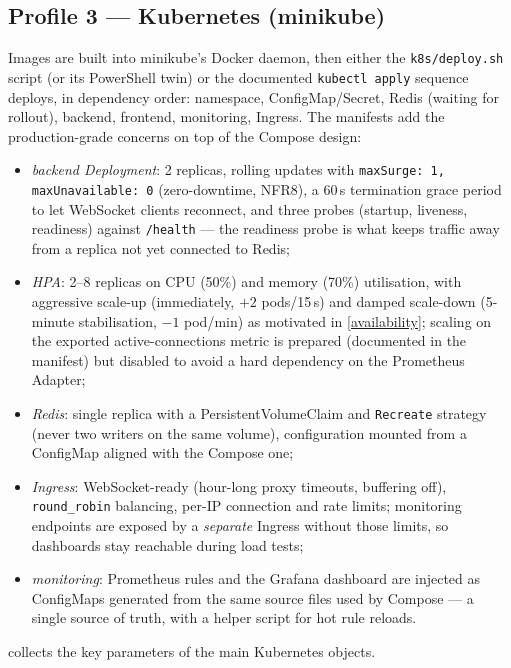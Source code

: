 \documentclass{scrartcl}
\begin{document}
\subsection{Profile 3 --- Kubernetes (minikube)}

Images are built into minikube's Docker daemon, then either the
\texttt{k8s/deploy.sh} script (or its PowerShell twin) or the documented
\texttt{kubectl apply} sequence deploys, in dependency order: namespace,
ConfigMap/Secret, Redis (waiting for rollout), backend, frontend,
monitoring, Ingress. The manifests add the production-grade concerns on
top of the Compose design:

\begin{itemize}
  \item \emph{backend Deployment}: 2 replicas, rolling updates with
  \texttt{maxSurge:~1, maxUnavailable:~0} (zero-downtime, NFR8), a 60\,s
  termination grace period to let WebSocket clients reconnect, and three
  probes (startup, liveness, readiness) against \texttt{/health} --- the
  readiness probe is what keeps traffic away from a replica not yet
  connected to Redis;
  \item \emph{HPA}: 2--8 replicas on CPU (50\%) and memory (70\%)
  utilisation, with aggressive scale-up (immediately, $+2$ pods/15\,s)
  and damped scale-down (5-minute stabilisation, $-1$ pod/min) as
  motivated in \cref{availability}; scaling on the exported
  active-connections metric is prepared (documented in the manifest) but
  disabled to avoid a hard dependency on the Prometheus Adapter;
  \item \emph{Redis}: single replica with a PersistentVolumeClaim and
  \texttt{Recreate} strategy (never two writers on the same volume),
  configuration mounted from a ConfigMap aligned with the Compose one;
  \item \emph{Ingress}: WebSocket-ready (hour-long proxy timeouts,
  buffering off), \texttt{round\_robin} balancing, per-IP connection and
  rate limits; monitoring endpoints are exposed by a \emph{separate}
  Ingress without those limits, so dashboards stay reachable during load
  tests;
  \item \emph{monitoring}: Prometheus rules and the Grafana dashboard are
  injected as ConfigMaps generated from the same source files used by
  Compose --- a single source of truth, with a helper script for hot
  rule reloads.
\end{itemize}

 collects the key parameters of the main Kubernetes objects.
\end{document}
